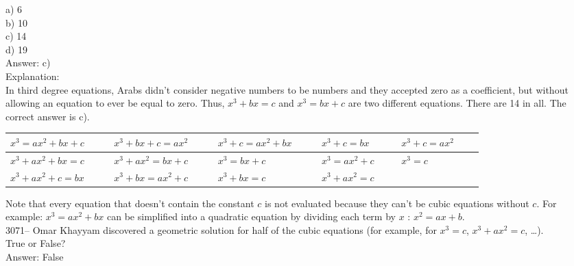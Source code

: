 \documentclass[letterpaper, 12pt]{article}
\begin{document}
a) 6\\
b) 10\\
c) 14\\
d) 19\\

Answer: c)\\

Explanation:\\
In third degree equations, Arabs didn't consider negative numbers to be numbers and they accepted zero as a coefficient, but without allowing an equation to ever be equal to zero. Thus, $x^{3} + bx = c$ and $x^{3} = bx + c$ are two different equations. There are 14 in all. The correct answer is c).
\begin{center}
\begin{tabular}{|l|l|l|l|l|}\hline
$x^{3} = ax^{2} + bx + c$ \ \ \ & $x^{3} + bx + c = ax^{2}$ \ \ \ & $x^{3} + c = ax^{2} + bx$ \ \ \ & $x^{3} + c = bx$ \ \ \ & $x^{3} + c = ax^{2}$ \ \ \ \\ \hline
$x^{3} + ax^{2} + bx = c$ \ \ \ & $x^{3} + ax^{2} = bx + c$ \ \ \ & $x^{3} = bx + c$ \ \ \ & $x^{3} = ax^{2} + c$ \ \ \ & $x^{3} = c$\ \ \ \\ \hline
$x^{3} + ax^{2} + c = bx$ \ \ \ & $x^{3} + bx = ax^{2} + c$ \ \ \ & $x^{3} + bx = c$ \ \ \ & $x^{3} + ax^{2} = c$ \ \ \ & \multicolumn{1}{l}{} \ \ \ \\ \cline{1-4}
\end{tabular}
\end{center}
Note that every equation that doesn't contain the constant $c$ is not evaluated because they can't be cubic equations without $c$. For example: $x^{3} = ax^{2} + bx$ can be simplified into a quadratic equation by dividing each term by $x$ : $x^{2} = ax + b$.\\



3071-- Omar Khayyam discovered a geometric solution for half of the cubic equations (for example, for $x^{3} = c$, $x^{3} + ax^{2} = c$, \dots).\\
True or False?\\

Answer: False\\
\end{document}
